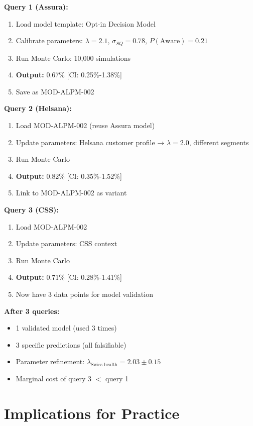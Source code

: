 \textbf{Query 1 (Assura):}
\begin{enumerate}
    \item Load model template: Opt-in Decision Model
    \item Calibrate parameters: $\lambda = 2.1$, $\sigma_{SQ} = 0.78$, $P(\text{Aware}) = 0.21$
    \item Run Monte Carlo: 10,000 simulations
    \item \textbf{Output:} 0.67\% [CI: 0.25\%-1.38\%]
    \item Save as MOD-ALPM-002
\end{enumerate}

\textbf{Query 2 (Helsana):}
\begin{enumerate}
    \item Load MOD-ALPM-002 (reuse Assura model)
    \item Update parameters: Helsana customer profile → $\lambda = 2.0$, different segments
    \item Run Monte Carlo
    \item \textbf{Output:} 0.82\% [CI: 0.35\%-1.52\%]
    \item Link to MOD-ALPM-002 as variant
\end{enumerate}

\textbf{Query 3 (CSS):}
\begin{enumerate}
    \item Load MOD-ALPM-002
    \item Update parameters: CSS context
    \item Run Monte Carlo
    \item \textbf{Output:} 0.71\% [CI: 0.28\%-1.41\%]
    \item Now have 3 data points for model validation
\end{enumerate}

\textbf{After 3 queries:}
\begin{itemize}[nosep]
    \item 1 validated model (used 3 times)
    \item 3 specific predictions (all falsifiable)
    \item Parameter refinement: $\lambda_{\text{Swiss health}} = 2.03 \pm 0.15$
    \item Marginal cost of query 3 $<$ query 1
\end{itemize}


\section{Implications for Practice}
\label{sec:bx-practice}

